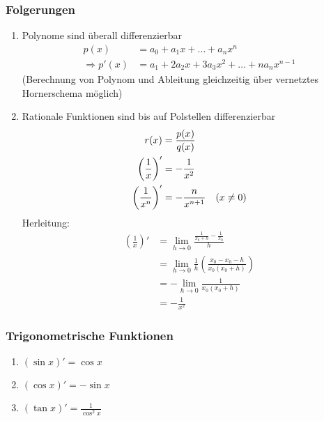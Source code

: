 
\subsubsection*{Folgerungen}

\begin{enumerate}
	\item Polynome sind überall differenzierbar \\
	\begin{align*}
		p(x) &= a_0 + a_1 x + \dots + a_n x^n \\
		\Rightarrow p'(x) &= a_1 + 2 a_2 x + 3 a_3 x^2 + \dots + n a_n x^{n-1}
	\end{align*}
	(Berechnung von Polynom und Ableitung gleichzeitig über vernetztes Hornerschema möglich)
	\item Rationale Funktionen sind bis auf Polstellen differenzierbar
	\begin{align*}
		r(x) &= \frac{p(x)}{q(x)} \\
		\left( \frac{1}{x} \right)' &= -\frac{1}{x^2} \\
		\left( \frac{1}{x^n} \right)' &= -\frac{n}{x^{n+1}} \hspace{10px} (x \neq 0)
	\end{align*}
	Herleitung:
	\begin{align*}
		\left( \frac{1}{x} \right)' &= \lim\limits_{h \rightarrow 0} \frac{\frac{1}{x_0+h} - \frac{1}{x_0}}{h} \\
		&= \lim\limits_{h \rightarrow 0} \frac{1}{h} \left( \frac{x_0 - x_0 - h}{x_0 (x_0+h)} \right) \\
		&= - \lim\limits_{h \rightarrow 0} \frac{1}{x_0 (x_0 + h)} \\
		&= -\frac{1}{x^2}
	\end{align*}
\end{enumerate}

\subsubsection*{Trigonometrische Funktionen}
\begin{enumerate}
	\item $ (\sin x)' = \cos x $
	\item $ (\cos x)' = - \sin x $
	\item $ (\tan x)' = \frac{1}{\cos^2 x} $
\end{enumerate}

